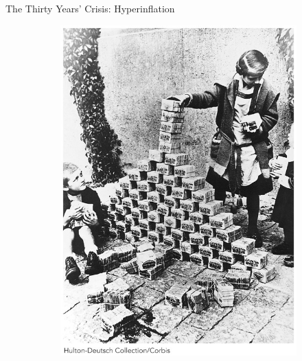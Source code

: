 \documentclass{beamer}
\begin{document}
\begin{frame}{\LARGE The Thirty Years' Crisis: Hyperinflation}
	\begin{figure}
		\centering
		\begin{subfigure}{0.49\textwidth}
			\centering
			\includegraphics[width = \textwidth,height=.9\textheight]{Deutschmarkpiles.jpg}
		\end{subfigure}
		\begin{subfigure}{0.49\textwidth} %
			\centering

\end{subfigure}
\end{figure}
\end{frame}
\end{document}
